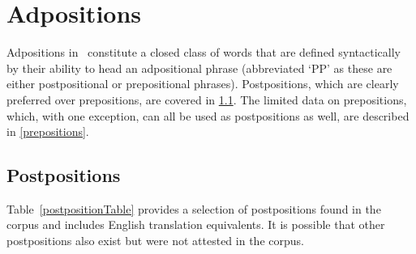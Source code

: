 \section{Adpositions}\label{adpositions}
Adpositions in \PS\ constitute a closed class of words that are defined syntactically by their ability to head an adpositional phrase (abbreviated ‘PP’ as these are either postpositional or prepositional phrases). 
Postpositions, which are clearly preferred over prepositions, are covered in \SEC\ref{postpositions}. The limited data on prepositions, which, with one exception, can all be used as postpositions as well, are described in \SEC\ref{prepositions}. 

\subsection{Postpositions}\label{postpositions}
Table~\vref{postpositionTable} provides a selection of postpositions found in the corpus and includes English translation equivalents. %
It is possible that other postpositions also exist but were not attested in the corpus. %
